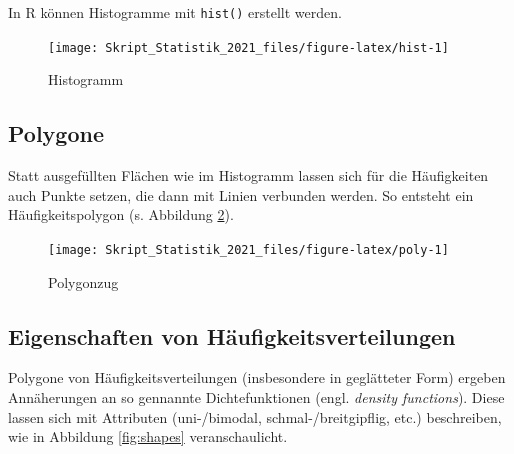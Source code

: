 \documentclass[
  11pt,
  ngerman,
  a4paper,
]{report}
\newenvironment{rtip}{
  \medskip
  \begin{tcolorbox}[colframe=purple,colback=light_gray,title=Softwarehinweis]
}{
  \end{tcolorbox}
  \medskip
}
\begin{document}
\begin{rtip}
In R können Histogramme mit \verb|hist()| erstellt werden.
\end{rtip}

\begin{figure}[!h]

{\centering \texttt{[image: Skript\_Statistik\_2021\_files/figure-latex/hist-1]} 

}

\caption{Histogramm}\label{fig:hist}
\end{figure}

\hypertarget{polygone}{%
\subsection{Polygone}\label{polygone}}

Statt ausgefüllten Flächen wie im Histogramm lassen sich für die Häufigkeiten auch Punkte setzen, die dann mit Linien verbunden werden. So entsteht ein Häufigkeitspolygon (s. Abbildung \ref{fig:poly}).

\begin{figure}[!h]

{\centering \texttt{[image: Skript\_Statistik\_2021\_files/figure-latex/poly-1]} 

}

\caption{Polygonzug}\label{fig:poly}
\end{figure}

\hypertarget{eigenschaften-von-huxe4ufigkeitsverteilungen}{%
\subsection{Eigenschaften von Häufigkeitsverteilungen}\label{eigenschaften-von-huxe4ufigkeitsverteilungen}}

Polygone von Häufigkeitsverteilungen (insbesondere in geglätteter Form) ergeben Annäherungen an so gennannte Dichtefunktionen (engl. \emph{density functions}). Diese lassen sich mit Attributen (uni-/bimodal, schmal-/breitgipflig, etc.) beschreiben, wie in Abbildung \ref{fig:shapes} veranschaulicht.
\end{document}
